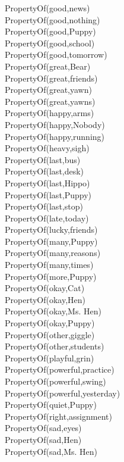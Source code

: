 \begin{multicols}{2}
\begin{footnotesize}
PropertyOf(good,news) \\
PropertyOf(good,nothing) \\
PropertyOf(good,Puppy) \\
PropertyOf(good,school) \\
PropertyOf(good,tomorrow) \\
PropertyOf(great,Bear) \\
PropertyOf(great,friends) \\
PropertyOf(great,yawn) \\
PropertyOf(great,yawns) \\
PropertyOf(happy,arms) \\
PropertyOf(happy,Nobody) \\
PropertyOf(happy,running) \\
PropertyOf(heavy,sigh) \\
PropertyOf(last,bus) \\
PropertyOf(last,desk) \\
PropertyOf(last,Hippo) \\
PropertyOf(last,Puppy) \\
PropertyOf(last,stop) \\
PropertyOf(late,today) \\
PropertyOf(lucky,friends) \\
PropertyOf(many,Puppy) \\
PropertyOf(many,reasons) \\
PropertyOf(many,times) \\
PropertyOf(more,Puppy) \\
PropertyOf(okay,Cat) \\
PropertyOf(okay,Hen) \\
PropertyOf(okay,Ms. Hen) \\
PropertyOf(okay,Puppy) \\
PropertyOf(other,giggle) \\
PropertyOf(other,students) \\
PropertyOf(playful,grin) \\
PropertyOf(powerful,practice) \\
PropertyOf(powerful,swing) \\
PropertyOf(powerful,yesterday) \\
PropertyOf(quiet,Puppy) \\
PropertyOf(right,assignment) \\
PropertyOf(sad,eyes) \\
PropertyOf(sad,Hen) \\
PropertyOf(sad,Ms. Hen) \\

\end{footnotesize}
\end{multicols}
